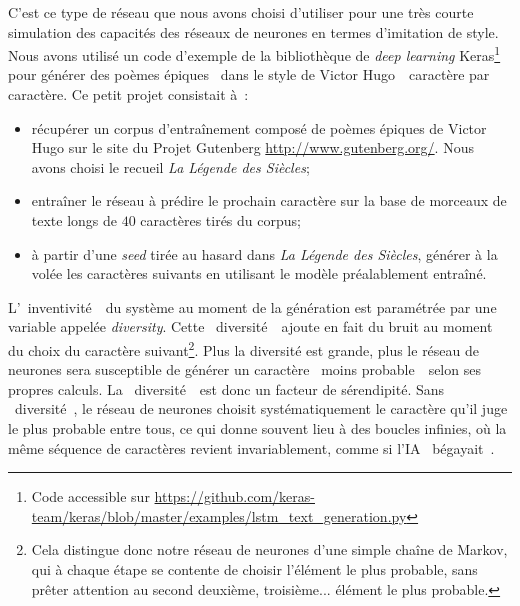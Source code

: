 \documentclass{article}
\begin{document}
					C'est ce type de réseau que nous avons choisi d'utiliser pour une très courte simulation des capacités des réseaux de neurones en termes d'imitation de style. Nous avons utilisé un code d'exemple de la bibliothèque de \textit{deep learning} Keras\footnote{Code accessible sur \href{https://github.com/keras-team/keras/blob/master/examples/lstm_text_generation.py}{https://github.com/keras-team/keras/blob/master/examples/lstm\_text\_generation.py}} pour générer des poèmes épiques \guillemotleft~dans le style de Victor Hugo~\guillemotright~caractère par caractère. Ce petit projet consistait à~:
					\vspace{2mm}
					\begin{itemize}
						\item récupérer un corpus d'entraînement composé de poèmes épiques de Victor Hugo sur le site du Projet Gutenberg \href{http://www.gutenberg.org/}{http://www.gutenberg.org/}. Nous avons choisi le recueil \textit{La Légende des Siècles};
						\item entraîner le réseau à prédire le prochain caractère sur la base de morceaux de texte longs de $40$ caractères tirés du corpus;
						\item à partir d'une \textit{seed} tirée au hasard dans \textit{La Légende des Siècles}, générer à la volée les caractères suivants en utilisant le modèle préalablement entraîné.
					\end{itemize}
					\vspace{2mm}
					L'\guillemotleft~inventivité~\guillemotright~du système au moment de la génération est paramétrée par une variable appelée \textit{diversity}. Cette \guillemotleft~diversité~\guillemotright~ajoute en fait du bruit au moment du choix du caractère suivant\footnote{Cela distingue donc notre réseau de neurones d'une simple chaîne de Markov, qui à chaque étape se contente de choisir l'élément le plus probable, sans prêter attention au second deuxième, troisième... élément le plus probable.}. Plus la diversité est grande, plus le réseau de neurones sera susceptible de générer un caractère \guillemotleft~moins probable~\guillemotright~selon ses propres calculs. La \guillemotleft~diversité~\guillemotright~est donc un facteur de sérendipité. Sans \guillemotleft~diversité~\guillemotright, le réseau de neurones choisit systématiquement le caractère qu'il juge le plus probable entre tous, ce qui donne souvent lieu à des boucles infinies, où la même séquence de caractères revient invariablement, comme si l'IA \guillemotleft~bégayait~\guillemotright.\\
					
\end{document}
